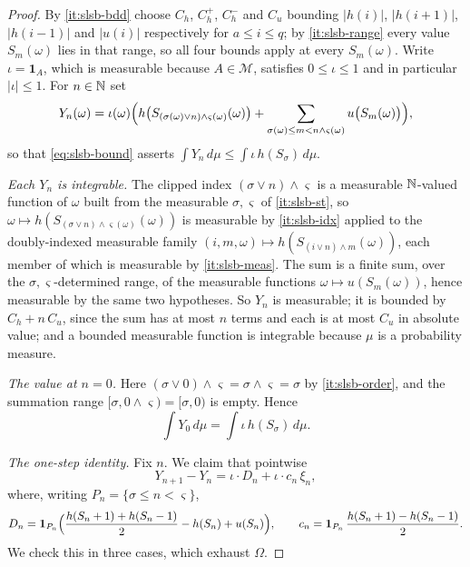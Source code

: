 \begin{proof}
By \ref{it:slsb-bdd} choose $C_h$, $C_h^+$, $C_h^-$ and $C_u$ bounding
$|h(i)|$, $|h(i+1)|$, $|h(i-1)|$ and $|u(i)|$ respectively for $a\le i\le q$;
by \ref{it:slsb-range} every value $S_m(\omega)$ lies in that range, so all four
bounds apply at every $S_m(\omega)$. Write $\iota=\mathbf1_A$, which is
measurable because $A\in\mathcal M$, satisfies $0\le\iota\le1$ and in particular
$|\iota|\le1$. For $n\in\mathbb{N}$ set
\[
  Y_n(\omega)=\iota(\omega)\Bigl(
    h\bigl(S_{(\sigma(\omega)\vee n)\wedge\varsigma(\omega)}(\omega)\bigr)
    +\sum_{\sigma(\omega)\le m<n\wedge\varsigma(\omega)}u\bigl(S_m(\omega)\bigr)
  \Bigr),
\]
so that \eqref{eq:slsb-bound} asserts $\int Y_n\,d\mu\le\int\iota\,h(S_\sigma)\,d\mu$.

\emph{Each $Y_n$ is integrable.} The clipped index
$(\sigma\vee n)\wedge\varsigma$ is a measurable $\mathbb{N}$-valued function of $\omega$
built from the measurable $\sigma,\varsigma$ of \ref{it:slsb-st}, so
$\omega\mapsto h(S_{(\sigma\vee n)\wedge\varsigma(\omega)}(\omega))$ is
measurable by \ref{it:slsb-idx} applied to the doubly-indexed measurable family
$(i,m,\omega)\mapsto h(S_{(i\vee n)\wedge m}(\omega))$, each member of which is
measurable by \ref{it:slsb-meas}. The sum is a finite sum, over the
$\sigma,\varsigma$-determined range, of the measurable functions
$\omega\mapsto u(S_m(\omega))$, hence measurable by the same two hypotheses.
So $Y_n$ is measurable; it is bounded by $C_h+n\,C_u$, since the sum has at
most $n$ terms and each is at most $C_u$ in absolute value; and a bounded
measurable function is integrable because $\mu$ is a probability measure.

\emph{The value at $n=0$.} Here $(\sigma\vee0)\wedge\varsigma
=\sigma\wedge\varsigma=\sigma$ by \ref{it:slsb-order}, and the summation range
$[\sigma,0\wedge\varsigma)=[\sigma,0)$ is empty. Hence
\begin{equation}\label{eq:slsb-Y0}
  \int Y_0\,d\mu=\int\iota\,h(S_\sigma)\,d\mu .
\end{equation}

\emph{The one-step identity.} Fix $n$. We claim that pointwise
\begin{equation}\label{eq:slsb-split}
  Y_{n+1}-Y_n
   =\iota\cdot D_n+\iota\cdot c_n\,\xi_n ,
\end{equation}
where, writing $P_n=\{\sigma\le n<\varsigma\}$,
\[
  D_n=\mathbf1_{P_n}\Bigl(\frac{h(S_n+1)+h(S_n-1)}{2}-h(S_n)+u(S_n)\Bigr),
  \qquad
  c_n=\mathbf1_{P_n}\,\frac{h(S_n+1)-h(S_n-1)}{2}.
\]
We check this in three cases, which exhaust $\Omega$.


\end{proof}
